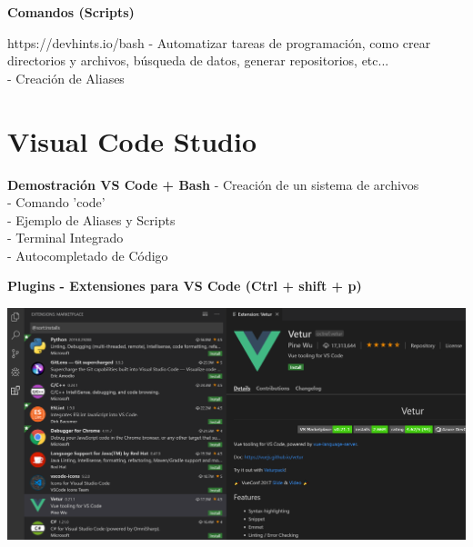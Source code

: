 \documentclass{beamer}
\begin{document}
\begin{frame}
	
	\textbf{Comandos (Scripts)}
	\begin{block}{https://devhints.io/bash}
		- Automatizar tareas de programación, como crear directorios y archivos, búsqueda de datos, generar repositorios, etc...\\
		\vspace{0.3cm}
		- Creación de Aliases
	\end{block}	
	
\end{frame}


\section{Visual Code Studio}
	\begin{frame}
		
		\begin{block}{\textbf{Demostración VS Code + Bash}}
			- Creación de un sistema de archivos \\
			\vspace{0.3cm}
			- Comando 'code' \\
			\vspace{0.3cm}
			- Ejemplo de Aliases y Scripts \\
			\vspace{0.3cm}
			- Terminal Integrado \\
			\vspace{0.3cm}
			- Autocompletado de Código \\
		\end{block}	
		
	\end{frame}

	\begin{frame}
		\textbf{Plugins - Extensiones para VS Code (Ctrl + shift + p)}
		\begin{center}
			\includegraphics[scale=.3]{img/extensions.png}
		\end{center}
	\end{frame}
\end{document}
